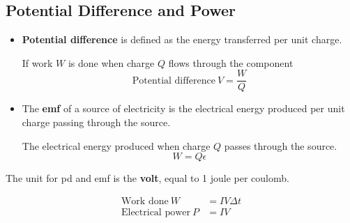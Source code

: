 \subsection{Potential Difference and Power}

\begin{itemize}
    \item \textbf{Potential difference} is defined as the energy transferred per unit charge.

        If work $W$ is done when charge $Q$ flows through the component
        $$\text{Potential difference}\ V=\frac{W}{Q}$$
    \item The \textbf{emf} of a source of electricity is the electrical energy produced per unit charge passing through the source.

        The electrical energy produced when charge $Q$ passes through the source.
        $$W=Q\epsilon$$
\end{itemize}


The unit for pd and emf is the \textbf{volt}, equal to 1 joule per coulomb.

\begin{align*}
    \text{Work done}\ W&=IV\Delta t\\
    \text{Electrical power}\ P&=IV
\end{align*}
